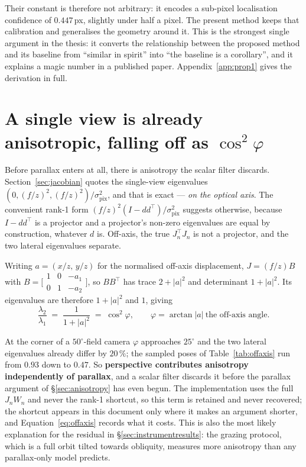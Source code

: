 Their constant is therefore not arbitrary: it encodes a sub-pixel localisation
confidence of $0.447$\,px, slightly under half a pixel. The present method keeps
that calibration and generalises the geometry around it. This is the strongest
single argument in the thesis: it converts the relationship between the proposed
method and its baseline from ``similar in spirit'' into ``the baseline is a
corollary'', and it explains a magic number in a published paper.
Appendix~\ref{app:prop1} gives the derivation in full.

\section{A single view is already anisotropic, falling off as $\cos^2\varphi$}
\label{sec:offaxis}

Before parallax enters at all, there is anisotropy the scalar filter discards.
Section~\ref{sec:jacobian} quotes the single-view eigenvalues
$(0, (f/z)^2, (f/z)^2)/\sigma_{\mathrm{pix}}^2$, and that is exact --- \emph{on
the optical axis}. The convenient rank-1 form
$(f/z)^2(I - dd^{\!\top})/\sigma_{\mathrm{pix}}^2$ suggests otherwise, because
$I - dd^{\!\top}$ is a projector and a projector's non-zero eigenvalues are equal
by construction, whatever $d$ is. Off-axis, the true $J_n^{\!\top}J_n$ is not a
projector, and the two lateral eigenvalues separate.

Writing $a = (x/z,\,y/z)$ for the normalised off-axis displacement,
$J = (f/z)B$ with $B = \big[\begin{smallmatrix}1&0&-a_1\\0&1&-a_2\end{smallmatrix}\big]$,
so $BB^{\!\top}$ has trace $2+|a|^2$ and determinant $1+|a|^2$. Its eigenvalues
are therefore $1+|a|^2$ and $1$, giving
\begin{equation}
  \frac{\lambda_2}{\lambda_1} \;=\; \frac{1}{1+|a|^2} \;=\; \cos^2\varphi,
  \qquad \varphi = \arctan|a| \ \text{the off-axis angle.}
  \label{eq:offaxis}
\end{equation}



At the corner of a $50^\circ$-field camera $\varphi$ approaches $25^\circ$ and
the two lateral eigenvalues already differ by $20\,\%$; the sampled poses of
Table~\ref{tab:offaxis} run from $0.93$ down to $0.47$. So \textbf{perspective
contributes anisotropy independently of parallax}, and a scalar filter discards
it before the parallax argument of \S\ref{sec:anisotropy} has even begun. The
implementation uses the full $J_nW_n$ and never the rank-1 shortcut, so this term is retained and never recovered; the shortcut appears in this document
only where it makes an argument shorter, and Equation~\eqref{eq:offaxis} records
what it costs. This is also the most likely explanation for the residual in
\S\ref{sec:instrumentresults}: the grazing protocol, which is a full orbit tilted
towards obliquity, measures more anisotropy than any parallax-only model
predicts.

